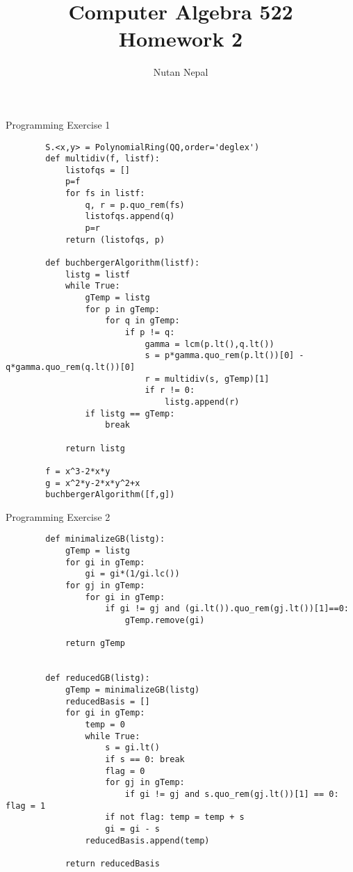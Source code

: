 \documentclass[12pt]{article}
\title{Computer Algebra 522\\
\large Homework 2
}
\author{Nutan Nepal}
\begin{document}
\maketitle
\makebox[\linewidth]{\rule{180mm}{1pt}}
\vspace{.1in}


Programming Exercise 1
\begin{mybox}
    \begin{lstlisting}
        S.<x,y> = PolynomialRing(QQ,order='deglex')
        def multidiv(f, listf):
            listofqs = []
            p=f
            for fs in listf:
                q, r = p.quo_rem(fs)
                listofqs.append(q)
                p=r
            return (listofqs, p)

        def buchbergerAlgorithm(listf):
            listg = listf
            while True:
                gTemp = listg
                for p in gTemp:
                    for q in gTemp:
                        if p != q:
                            gamma = lcm(p.lt(),q.lt())
                            s = p*gamma.quo_rem(p.lt())[0] - q*gamma.quo_rem(q.lt())[0]
                            r = multidiv(s, gTemp)[1]
                            if r != 0:
                                listg.append(r)
                if listg == gTemp:
                    break

            return listg

        f = x^3-2*x*y
        g = x^2*y-2*x*y^2+x
        buchbergerAlgorithm([f,g])

    \end{lstlisting}
\end{mybox}

Programming Exercise 2
\begin{mybox}
    \begin{lstlisting}
        def minimalizeGB(listg):
            gTemp = listg
            for gi in gTemp:
                gi = gi*(1/gi.lc())
            for gj in gTemp:
                for gi in gTemp:
                    if gi != gj and (gi.lt()).quo_rem(gj.lt())[1]==0:
                        gTemp.remove(gi)

            return gTemp


        def reducedGB(listg):
            gTemp = minimalizeGB(listg)
            reducedBasis = []
            for gi in gTemp:
                temp = 0
                while True:
                    s = gi.lt()
                    if s == 0: break
                    flag = 0
                    for gj in gTemp:
                        if gi != gj and s.quo_rem(gj.lt())[1] == 0: flag = 1
                    if not flag: temp = temp + s
                    gi = gi - s
                reducedBasis.append(temp)
                
            return reducedBasis
    \end{lstlisting}
\end{mybox}
\end{document}
